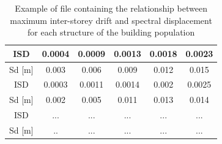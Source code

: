 \begin {table}[htb]
\caption{Example of file containing the relationship between maximum inter-storey drift and spectral displacement for each structure of the building population}
\label{table:isd-sd}
\begin{center}
  \begin{tabular}{ | c | c | c | c | c | c |}
  \hline
    ISD & 0.0004 & 0.0009 & 0.0013 &	0.0018 & 0.0023 \\ \hline
    Sd [m] & 0.003 &	0.006 & 0.009 &	0.012 &	0.015 \\ \hline
    ISD & 0.0003 & 0.0011 & 0.0014 &	0.002 & 0.0025 \\ \hline
    Sd [m] & 0.002 &	0.005 & 0.011 &	0.013 &	0.014 \\ \hline
    ISD & ... & ... & ... &	... & ... \\ \hline
    Sd [m] & .. &... & ... &... &... \\ \hline
  \end{tabular}
\end{center}
\end{table}